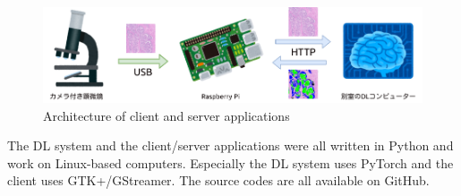 \vspace{1zh}

\begin{figure}\centering
  \includegraphics[width=\columnwidth]{assets/arch.png}
  \caption{Architecture of client and server applications}
  \label{fig:arch}
\end{figure}

The DL system and the client/server applications were all written in Python and work on Linux-based computers. Especially the DL system uses PyTorch and the client uses GTK+/GStreamer. The source codes are all available on GitHub.\cite{gh-prostate}\cite{gh-pai} \par
